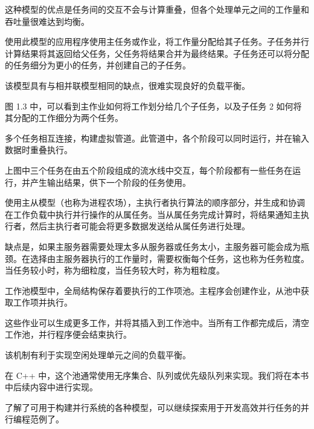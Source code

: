 
这种模型的优点是任务间的交互不会与计算重叠，但各个处理单元之间的工作量和吞吐量很难达到均衡。


使用此模型的应用程序使用主任务或作业，将工作量分配给其子任务。子任务并行计算结果将其返回给父任务，父任务将结果合并为最终结果。子任务还可以将分配的任务细分为更小的任务，并创建自己的子任务。

该模型具有与相并联模型相同的缺点，很难实现良好的负载平衡。


图 1.3 中，可以看到主作业如何将工作划分给几个子任务，以及子任务 2 如何将其分配的工作细分为两个任务。


多个任务相互连接，构建虚拟管道。此管道中，各个阶段可以同时运行，并在输入数据时重叠执行。


上图中三个任务在由五个阶段组成的流水线中交互，每个阶段都有一些任务在运行，并产生输出结果，供下一个阶段的任务使用。


使用主从模型（也称为进程农场），主执行者执行算法的顺序部分，并生成和协调在工作负载中执行并行操作的从属任务。当从属任务完成计算时，将结果通知主执行者，然后主执行者可能会将更多数据发送给从属任务进行处理。


缺点是，如果主服务器需要处理太多从服务器或任务太小，主服务器可能会成为瓶颈。在选择由主服务器执行的工作量时，需要权衡每个任务，这也称为任务粒度。当任务较小时，称为细粒度，当任务较大时，称为粗粒度。


工作池模型中，全局结构保存着要执行的工作项池。主程序会创建作业，从池中获取工作项并执行。

这些作业可以生成更多工作，并将其插入到工作池中。当所有工作都完成后，清空工作池，并行程序便会结束执行。


该机制有利于实现空闲处理单元之间的负载平衡。

在 C++ 中，这个池通常使用无序集合、队列或优先级队列来实现。我们将在本书中后续内容中进行实现。

\hspace*{\fill}

了解了可用于构建并行系统的各种模型，可以继续探索用于开发高效并行任务的并行编程范例了。





























